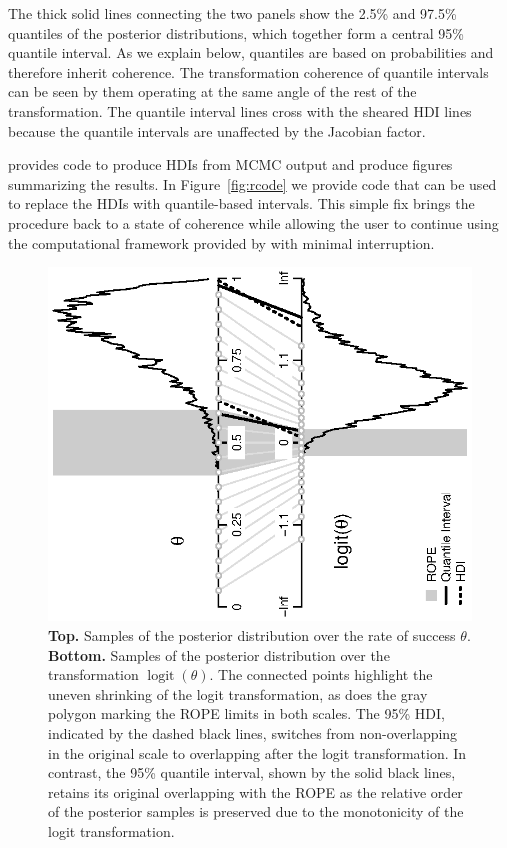 \documentclass[9pt,twocolumn,twoside]{cidlab-draft}\templatetype{cidlab-invited}
\DeclareMathOperator*{\logit}{logit}
\begin{document}
The thick solid lines connecting the two panels show the 2.5\% and 97.5\% quantiles of the posterior distributions, which together form a central 95\% quantile interval. As we explain below, quantiles are based on probabilities and therefore inherit coherence. The transformation coherence of quantile intervals can be seen by them operating at the same angle of the rest of the transformation. The quantile interval lines cross with the sheared HDI lines because the quantile intervals are unaffected by the Jacobian factor.

 provides code to produce HDIs from MCMC output and produce figures summarizing the results. In Figure~\ref{fig:rcode} we provide code that can be used to replace the HDIs with quantile-based intervals. This simple fix brings the procedure back to a state of coherence while allowing the user to continue using the computational framework provided by  with minimal interruption.

\begin{figure}
    \includegraphics[scale=.9,angle=-90]{p/transformation.eps}
    \caption{\textbf{Top.} Samples of the posterior distribution over the rate of success $\theta$. \textbf{Bottom.} Samples of the posterior distribution over the transformation $\logit(\theta)$. The connected points highlight the uneven shrinking of the logit transformation, as does the gray polygon marking the ROPE limits in both scales.
    The 95\% HDI, indicated by the dashed black lines, switches from non-overlapping in the original scale to overlapping after the logit transformation.
    In contrast, the 95\% quantile interval, shown by the solid black lines, retains its original overlapping with the ROPE as the relative order of the posterior samples is preserved due to the monotonicity of the logit transformation.}
    \label{fig:transformation}
\end{figure}
\end{document}
